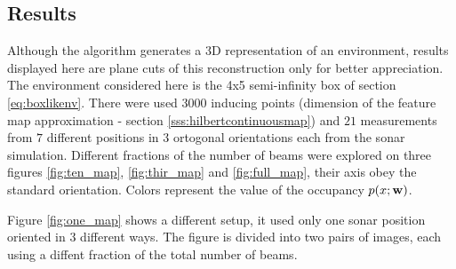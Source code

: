 \subsection{Results}

Although the algorithm generates a 3D representation of an environment, results
displayed here are plane cuts of this reconstruction only for better
appreciation. The environment considered here is the 4x5 semi-infinity box of
section \ref{eq:boxlikenv}. There were used $3000$ inducing points (dimension of
the feature map approximation - section \ref{sss:hilbertcontinuousmap}) and $21$
measurements from $7$ different positions in $3$ ortogonal orientations each
from the sonar simulation. Different fractions of the number of beams were
explored on three figures \ref{fig:ten_map}, \ref{fig:thir_map} and
\ref{fig:full_map}, their axis obey the standard orientation. Colors represent
the value of the occupancy $p(x;\mathrm{\mathbf{w}})$.

Figure \ref{fig:one_map} shows a different setup, it used only one sonar
position oriented in $3$ different ways. The figure is divided into two pairs of
images, each using a diffent fraction of the total number of beams.

